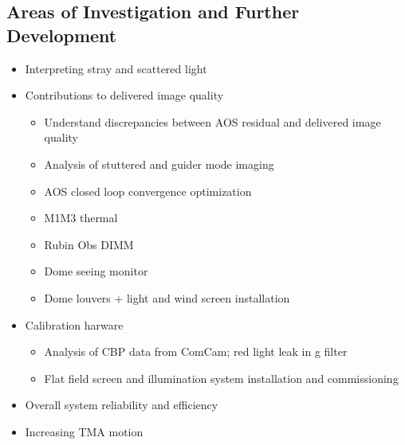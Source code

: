 \subsection{Areas of Investigation and Further Development}

\begin{itemize}
    \item Interpreting stray and scattered light
    \item Contributions to delivered image quality
    \begin{itemize}
        \item Understand discrepancies between AOS residual and delivered image quality
        \item Analysis of stuttered and guider mode imaging
        \item AOS closed loop convergence optimization
        \item M1M3 thermal
        \item Rubin Obs DIMM
        \item Dome seeing monitor
        \item Dome louvers + light and wind screen installation
    \end{itemize}
    \item Calibration harware
    \begin{itemize}
        \item Analysis of CBP data from ComCam; red light leak in g filter
        \item Flat field screen and illumination system installation and commissioning
    \end{itemize}
    \item Overall system reliability and efficiency
    \item Increasing TMA motion
\end{itemize}